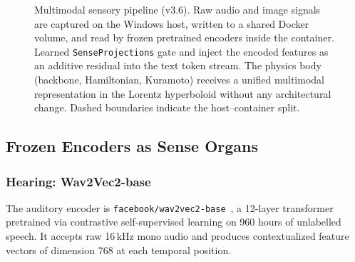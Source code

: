 \begin{figure}[t]
{
}%
\caption{%
Multimodal sensory pipeline (v3.6).
Raw audio and image signals are captured on the Windows host, written to a shared Docker volume, and read by frozen pretrained encoders inside the container.
Learned \texttt{SenseProjections} gate and inject the encoded features as an additive residual into the text token stream.
The physics body (backbone, Hamiltonian, Kuramoto) receives a unified multimodal representation in the Lorentz hyperboloid without any architectural change.
Dashed boundaries indicate the host--container split.
}
\label{fig:senses}
\end{figure}

\subsection{Frozen Encoders as Sense Organs}
\label{sec:encoders}

\subsubsection{Hearing: Wav2Vec2-base}

The auditory encoder is \texttt{facebook/wav2vec2-base}~\cite{wav2vec2_2020}, a 12-layer transformer pretrained via contrastive self-supervised learning on 960 hours of unlabelled speech.
It accepts raw 16\,kHz mono audio and produces contextualized feature vectors of dimension 768 at each temporal position.

